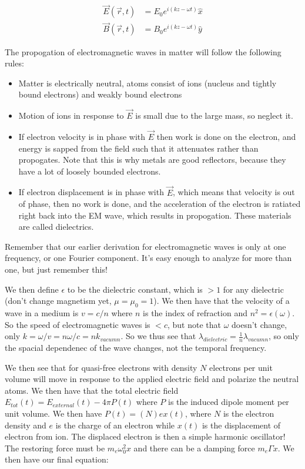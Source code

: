 \documentclass{report}
\begin{document}
\begin{align*}
\vec{E}(\vec{r},t) &= E_0 e^{i(kz - \omega t)} \hat{x}\\
\vec{B}(\vec{r},t) &= B_0e^{i(kz - \omega t)} \hat{y}
\end{align*}

The propogation of electromagnetic waves in matter will follow the following rules:

\begin{itemize}
\item Matter is electrically neutral, atoms consist of ions (nucleus and tightly bound electrons) and weakly bound electrons
\item Motion of ions in response to $\vec{E}$ is small due to the large mass, so neglect it.
\item If electron velocity is in phase with $\vec{E}$ then work is done on the electron, and energy is sapped from the field such that it attenuates rather than propogates. Note that this is why metals are good reflectors, because they have a lot of loosely bounded electrons.
\item If electron displacement is in phase with $\vec{E}$, which means that velocity is out of phase, then no work is done, and the acceleration of the electron is ratiated right back into the EM wave, which results in propogation. These materials are called dielectrics.
\end{itemize}

Remember that our earlier derivation for electromagnetic waves is only at one frequency, or one Fourier component. It's easy enough to analyze for more than one, but just remember this!

We then define $\epsilon$ to be the dielectric constant, which is $>1$ for any dielectric (don't change magnetism yet, $\mu = \mu_0 = 1$). We then have that the velocity of a wave in a medium is $v=c/n$ where $n$ is the index of refraction and $n^2 = \epsilon(\omega)$. So the speed of electromagnetic waves is $<c$, but note that $\omega$ doesn't change, only $k = \omega/v = n\omega/c = nk_{vacumn}$. So we thus see that $\lambda_{dielectric} = \frac{1}{n}\lambda_{vacumn}$, so only the spacial dependenec of the wave changes, not the temporal frequency. 

We then see that for quasi-free electrons with density $N$ electrons per unit volume will move in response to the applied electric field and polarize the neutral atoms. We then have that the total electric field $E_{tot}(t) = E_{external}(t) - 4\pi P(t)$ where $P$ is the induced dipole moment per unit volume. We then have $P(t) = (N)ex(t)$, where $N$ is the electron density and $e$ is the charge of an electron while $x(t)$ is the displacement of electron from ion. The displaced electron is then a simple harmonic oscillator! The restoring force must be $m_e\omega_0^2x$ and there can be a damping force $m_e\Gamma\dot{x}$. We then have our final equation:
\end{document}

